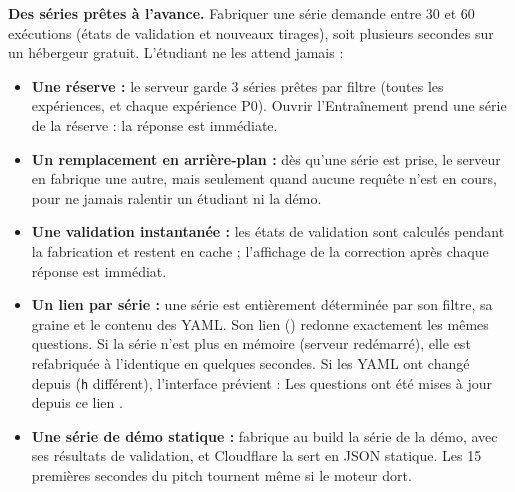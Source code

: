 \documentclass[11pt,a4paper]{article}
\begin{document}
\textbf{Des séries prêtes à l'avance.} Fabriquer une série demande entre 30 et 60 exécutions (états de validation et nouveaux tirages), soit plusieurs secondes sur un hébergeur gratuit. L'étudiant ne les attend jamais :
\begin{itemize}[leftmargin=*, nosep]
  \item \textbf{Une réserve :} le serveur garde 3 séries prêtes par filtre (toutes les expériences, et chaque expérience P0). Ouvrir l'Entraînement prend une série de la réserve : la réponse est immédiate.
  \item \textbf{Un remplacement en arrière-plan :} dès qu'une série est prise, le serveur en fabrique une autre, mais seulement quand aucune requête n'est en cours, pour ne jamais ralentir un étudiant ni la démo.
  \item \textbf{Une validation instantanée :} les états de validation sont calculés pendant la fabrication et restent en cache ; l'affichage de la correction après chaque réponse est immédiat.
  \item \textbf{Un lien par série :} une série est entièrement déterminée par son filtre, sa graine et le contenu des YAML. Son lien () redonne exactement les mêmes questions. Si la série n'est plus en mémoire (serveur redémarré), elle est refabriquée à l'identique en quelques secondes. Si les YAML ont changé depuis (\texttt{h} différent), l'interface prévient : \og Les questions ont été mises à jour depuis ce lien \fg{}.
  \item \textbf{Une série de démo statique :}  fabrique au build la série de la démo, avec ses résultats de validation, et Cloudflare la sert en JSON statique. Les 15 premières secondes du pitch tournent même si le moteur dort.
\end{itemize}
\end{document}
